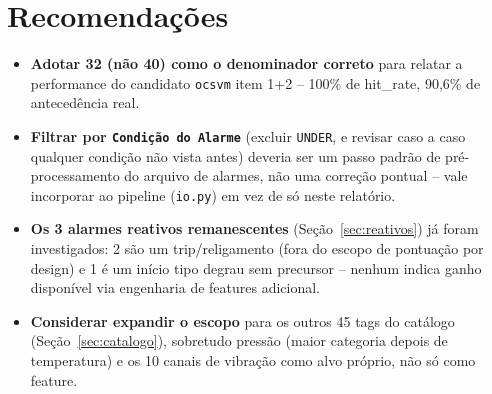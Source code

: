 \documentclass[11pt,a4paper]{article}
\begin{document}
\section{Recomendações}

\begin{itemize}
  \item \textbf{Adotar 32 (não 40) como o denominador correto} para
        relatar a performance do candidato \texttt{ocsvm} item 1+2 --
        100\% de hit\_rate, 90,6\% de antecedência real.
  \item \textbf{Filtrar por \texttt{Condição do Alarme}} (excluir
        \texttt{UNDER}, e revisar caso a caso qualquer condição não
        vista antes) deveria ser um passo padrão de pré-processamento do
        arquivo de alarmes, não uma correção pontual -- vale incorporar
        ao pipeline (\texttt{io.py}) em vez de só neste relatório.
  \item \textbf{Os 3 alarmes reativos remanescentes} (Seção~\ref{sec:reativos})
        já foram investigados: 2 são um trip/religamento (fora do escopo
        de pontuação por design) e 1 é um início tipo degrau sem
        precursor -- nenhum indica ganho disponível via engenharia de
        features adicional.
  \item \textbf{Considerar expandir o escopo} para os outros 45 tags do
        catálogo (Seção~\ref{sec:catalogo}), sobretudo pressão (maior
        categoria depois de temperatura) e os 10 canais de vibração como
        alvo próprio, não só como feature.
\end{itemize}
\end{document}
